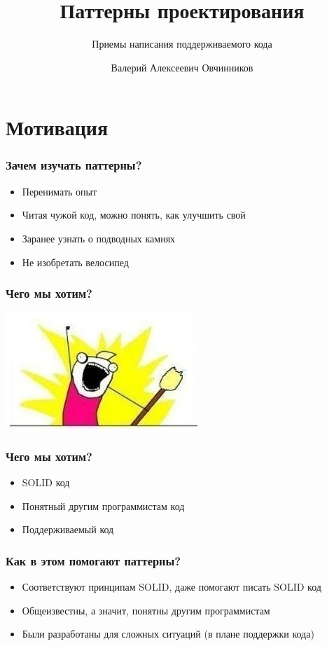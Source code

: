 \documentclass[russian,aspectratio=169,14pt]{beamer}
\title{Паттерны проектирования}
\subtitle{Приемы написания поддерживаемого кода}
\author{Валерий Алексеевич Овчинников}
\institute{valery.ovchinnikov@phystech.edu}
\begin{document}
\maketitle

\section{Мотивация}

\begin{frame}
	\frametitle{Зачем изучать паттерны?}
	\begin{itemize}
		\item Перенимать опыт
		\pause
		\item Читая чужой код, можно понять, как улучшить свой
		\pause
		\item Заранее узнать о подводных камнях
		\pause
		\item Не изобретать велосипед
	\end{itemize}
\end{frame}

\begin{frame}
	\frametitle{Чего мы хотим?}
	\begin{center}
	\includegraphics[height=0.75\textheight]{want.jpeg}
	\end{center}
\end{frame}

\begin{frame}
	\frametitle{Чего мы хотим?}
	\begin{itemize}
		\item SOLID код
		\item Понятный другим программистам код
		\item Поддерживаемый код
	\end{itemize}
\end{frame}

\begin{frame}
	\frametitle{Как в этом помогают паттерны?}
	\begin{itemize}
		\item Соответствуют принципам SOLID, даже помогают писать SOLID код
		\item Общеизвестны, а значит, понятны другим программистам
		\item Были разработаны для сложных ситуаций (в плане поддержки кода)
	\end{itemize}
\end{frame}
\end{document}
